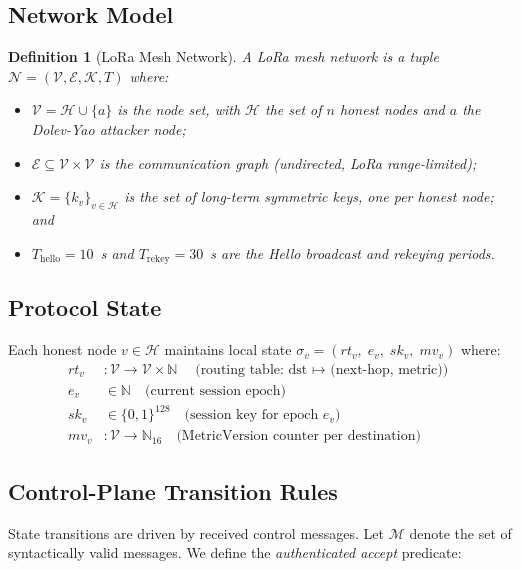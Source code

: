 \documentclass[10pt,journal,compsoc]{IEEEtran}
\newtheorem{definition}{Definition}
\begin{document}
\subsection{Network Model}

\begin{definition}[LoRa Mesh Network]
A LoRa mesh network is a tuple $\mathcal{N} = (\mathcal{V}, \mathcal{E}, \mathcal{K}, T)$
where:
\begin{itemize}
  \item $\mathcal{V} = \mathcal{H} \cup \{a\}$ is the node set,
    with $\mathcal{H}$ the set of $n$ honest nodes and $a$ the
    Dolev-Yao attacker node;
  \item $\mathcal{E} \subseteq \mathcal{V} \times \mathcal{V}$ is
    the communication graph (undirected, LoRa range-limited);
  \item $\mathcal{K} = \{k_v\}_{v \in \mathcal{H}}$ is the set of
    long-term symmetric keys, one per honest node; and
  \item $T_{\text{hello}} = 10$~s and $T_{\text{rekey}} = 30$~s
    are the Hello broadcast and rekeying periods.
\end{itemize}
\end{definition}

\subsection{Protocol State}

Each honest node $v \in \mathcal{H}$ maintains local state
$\sigma_v = (rt_v,\; e_v,\; sk_v,\; mv_v)$ where:
\begin{align}
  rt_v &: \mathcal{V} \to \mathcal{V} \times \mathbb{N}
          \quad\text{(routing table: dst $\mapsto$ (next-hop, metric))} \\
  e_v  &\in \mathbb{N}
          \quad\text{(current session epoch)} \\
  sk_v &\in \{0,1\}^{128}
          \quad\text{(session key for epoch $e_v$)} \\
  mv_v &: \mathcal{V} \to \mathbb{N}_{16}
          \quad\text{(MetricVersion counter per destination)}
\end{align}

\subsection{Control-Plane Transition Rules}

State transitions are driven by received control messages.
Let $\mathcal{M}$ denote the set of syntactically valid messages.
We define the \emph{authenticated accept} predicate:
\end{document}
